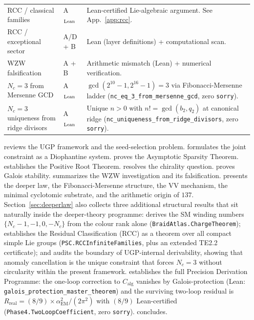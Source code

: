 \documentclass[11pt]{article}
\theoremstyle{remark}
\newcommand{\Nc}{N_c}
\newcommand{\Calg}{C_{\mathrm{alg}}}
\begin{document}
\begin{table}[H]
\begin{tabularx}{\linewidth}{@{}p{3.6cm}p{2.1cm}X@{}}
RCC / classical families & A$_{\rm Lean}$ & Lean-certified Lie-algebraic argument. See App.~\ref{app:rcc}. \\
RCC / exceptional sector & A/D + B & Lean (layer definitions) + computational scan. \\
WZW falsification & A + B & Arithmetic mismatch (Lean) + numerical verification. \\
$\Nc=3$ from Mersenne GCD & A$_{\rm Lean}$ & $\gcd(2^{10}-1,2^{16}-1)=3$ via Fibonacci-Mersenne ladder (\texttt{nc\_eq\_3\_from\_mersenne\_gcd}, zero \texttt{sorry}). \\
$\Nc=3$ uniqueness from ridge divisors & A$_{\rm Lean}$ & Unique $n>0$ with $n!=\gcd(b_2,q_2)$ at canonical ridge (\texttt{nc\_uniqueness\_from\_ridge\_divisors}, zero \texttt{sorry}). \\
\bottomrule
\end{tabularx}
\end{table}

 reviews the UGP framework and the seed-selection problem.
 formulates the joint constraint as a Diophantine system.
 proves the Asymptotic Sparsity Theorem.
 establishes the Positive Root Theorem.
 resolves the chirality question.
 proves Galois stability.
 summarizes the WZW investigation and its falsification.
 presents the deeper law, the Fibonacci-Mersenne structure,
the VV mechanism, the minimal cyclotomic substrate, and the arithmetic origin of $137$.
Section~\ref{sec:deeperlaw} also collects three additional structural results that
sit naturally inside the deeper-theory programme:
 derives the SM winding numbers
$\{\Nc{-}1,{-}1,0,{-}\Nc\}$ from the colour rank alone
(\texttt{BraidAtlas.ChargeTheorem});
 establishes the Residual Classification (RCC) as a
theorem over all compact simple Lie groups
(\texttt{PSC.RCCInfiniteFamilies}, plus an extended TE2.2 certificate);
and  audits the boundary of UGP-internal derivability,
showing that anomaly cancellation is the unique constraint that forces $\Nc = 3$
without circularity within the present framework.
 establishes the full Precision Derivation
Programme: the one-loop correction to $\Calg$ vanishes by Galois-protection
(Lean: \texttt{galois\_protection\_master\_theorem}) and the surviving two-loop
residual is $R_{\mathrm{real}} = (8/9) \times \alpha_{\mathrm{EM}}^2/(2\pi^2)$
with $(8/9)$ Lean-certified (\texttt{Phase4.TwoLoopCoefficient}, zero \texttt{sorry}).
 concludes.
\end{document}
